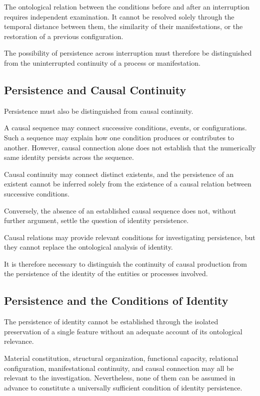 The ontological relation between the conditions before
and after an interruption requires independent examination.
It cannot be resolved solely through the temporal
distance between them, the similarity of their
manifestations, or the restoration of a previous
configuration.

The possibility of persistence across interruption
must therefore be distinguished from the uninterrupted
continuity of a process or manifestation.

\subsection{Persistence and Causal Continuity}

Persistence must also be distinguished from causal
continuity.

A causal sequence may connect successive conditions,
events, or configurations. Such a sequence may explain
how one condition produces or contributes to another.
However, causal connection alone does not establish
that the numerically same identity persists across
the sequence.

Causal continuity may connect distinct existents,
and the persistence of an existent cannot be inferred
solely from the existence of a causal relation between
successive conditions.

Conversely, the absence of an established causal
sequence does not, without further argument, settle
the question of identity persistence.

Causal relations may provide relevant conditions
for investigating persistence, but they cannot replace
the ontological analysis of identity.

It is therefore necessary to distinguish the continuity
of causal production from the persistence of the identity
of the entities or processes involved.

\subsection{Persistence and the Conditions of Identity}

The persistence of identity cannot be established
through the isolated preservation of a single feature
without an adequate account of its ontological relevance.

Material constitution, structural organization,
functional capacity, relational configuration,
manifestational continuity, and causal connection
may all be relevant to the investigation. Nevertheless,
none of them can be assumed in advance to constitute
a universally sufficient condition of identity persistence.

